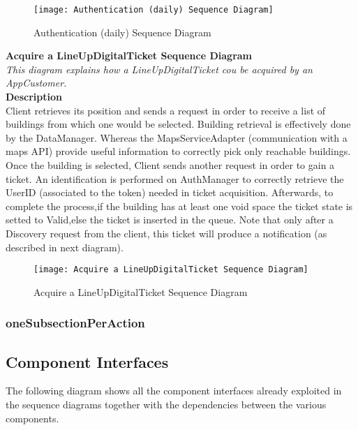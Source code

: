 \begin{figure}[H]
 \centering
 \texttt{[image: Authentication (daily) Sequence Diagram]}
 \caption{Authentication (daily) Sequence Diagram}
 \end{figure}

\newpage
\textbf{ Acquire a LineUpDigitalTicket Sequence Diagram\\}
\textit{This diagram explains how a LineUpDigitalTicket cou be acquired by an AppCustomer.\\}
\textbf{Description\\}
Client retrieves its position and sends a request in order to receive a list of buildings from which one would be selected. Building retrieval is effectively done by the DataManager. Whereas the MapsServiceAdapter (communication with a maps API) provide useful information to correctly pick only reachable buildings.
Once the building is selected, Client sends another request in order to gain a ticket. An identification is performed on AuthManager to correctly retrieve the UserID (associated to the token) needed in ticket acquisition. Afterwards, to complete the process,if the building has at least one void space the ticket state is setted to Valid,else the ticket is inserted in the queue.
Note that only after a Discovery request from the client, this ticket will produce a notification (as described in next diagram).\\

\begin{figure}[H]
 \centering
 \texttt{[image: Acquire a LineUpDigitalTicket Sequence Diagram]}
 \caption{ Acquire a LineUpDigitalTicket Sequence Diagram}
 \end{figure}

\subsubsection{oneSubsectionPerAction}

\subsection{Component Interfaces}
The following diagram shows all the component interfaces already exploited in the sequence diagrams together with the dependencies between the various components. 
\newpage
